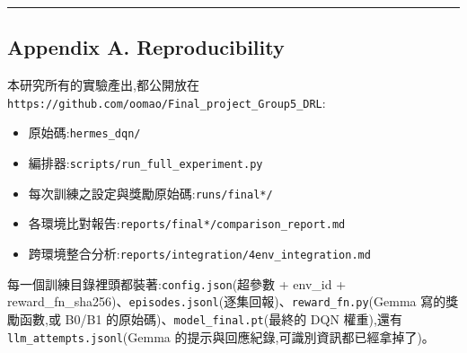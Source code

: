 \begin{center}\rule{0.5\linewidth}{0.5pt}\end{center}

\subsection{Appendix A. Reproducibility}\label{appendix-a-reproducibility}

本研究所有的實驗產出,都公開放在 \texttt{https://github.com/oomao/Final\_project\_Group5\_DRL}:

\begin{itemize}
\tightlist
\item
  原始碼:\texttt{hermes\_dqn/}
\item
  編排器:\texttt{scripts/run\_full\_experiment.py}
\item
  每次訓練之設定與獎勵原始碼:\texttt{runs/final*/}
\item
  各環境比對報告:\texttt{reports/final*/comparison\_report.md}
\item
  跨環境整合分析:\texttt{reports/integration/4env\_integration.md}
\end{itemize}

每一個訓練目錄裡頭都裝著:\texttt{config.json}(超參數 + env\_id + reward\_fn\_sha256)、\texttt{episodes.jsonl}(逐集回報)、\texttt{reward\_fn.py}(Gemma 寫的獎勵函數,或 B0/B1 的原始碼)、\texttt{model\_final.pt}(最終的 DQN 權重),還有 \texttt{llm\_attempts.jsonl}(Gemma 的提示與回應紀錄,可識別資訊都已經拿掉了)。
